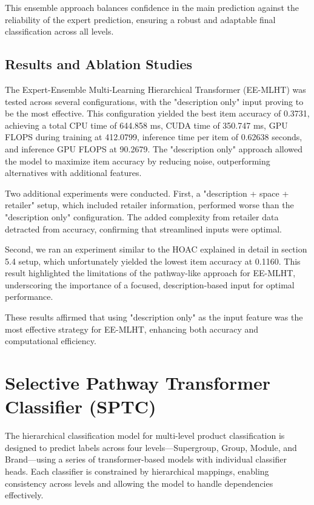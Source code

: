 \documentclass[9pt,a4paper,twoside]{rho-class/rho}
\begin{document}
This ensemble approach balances confidence in the main prediction against the reliability of the expert prediction, ensuring a robust and adaptable final classification across all levels.

 
 \subsection{Results and Ablation Studies}
    
    The Expert-Ensemble Multi-Learning Hierarchical Transformer (EE-MLHT) was tested across several configurations, with the "description only" input proving to be the most effective. This configuration yielded the best item accuracy of 0.3731, achieving a total CPU time of 644.858 ms, CUDA time of 350.747 ms, GPU FLOPS during training at 412.0799, inference time per item of 0.62638 seconds, and inference GPU FLOPS at 90.2679. The "description only" approach allowed the model to maximize item accuracy by reducing noise, outperforming alternatives with additional features.
    
    Two additional experiments were conducted. First, a "description + space + retailer" setup, which included retailer information, performed worse than the "description only" configuration. The added complexity from retailer data detracted from accuracy, confirming that streamlined inputs were optimal.
    
    Second, we ran an experiment similar to the HOAC explained in detail in section 5.4 setup, which unfortunately yielded the lowest item accuracy at 0.1160. This result highlighted the limitations of the pathway-like approach for EE-MLHT, underscoring the importance of a focused, description-based input for optimal performance.
    
    These results affirmed that using "description only" as the input feature was the most effective strategy for EE-MLHT, enhancing both accuracy and computational efficiency.

\section{Selective Pathway Transformer Classifier (SPTC)}

The hierarchical classification model for multi-level product classification is designed to predict labels across four levels—Supergroup, Group, Module, and Brand—using a series of transformer-based models with individual classifier heads. Each classifier is constrained by hierarchical mappings, enabling consistency across levels and allowing the model to handle dependencies effectively.
\end{document}
